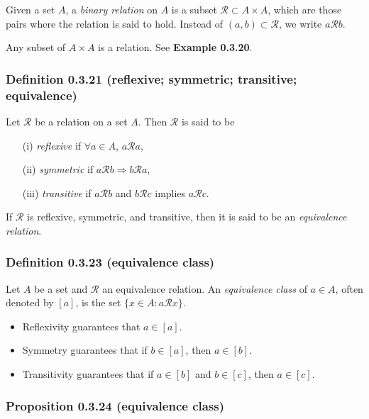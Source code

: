 \documentclass[12pt, letterpaper, oneside]{book}
\begin{document}
Given a set $A$, a \textit{binary relation} on $A$ is a subset $\mathcal{R}
  \subset A \times A$, which are those pairs where the relation is said to hold.
Instead of $(a, b) \subset \mathcal{R}$, we write $a \mathcal{R} b$.

Any subset of $A \times A$ is a relation. See \textbf{Example 0.3.20}.

\subsubsection{
  Definition 0.3.21 (reflexive; symmetric; transitive; equivalence)
}

Let $\mathcal{R}$ be a relation on a set $A$. Then $\mathcal{R}$ is said to be
\begin{enumerate}
  \item[(i)] \textit{reflexive} if $\forall a \in A$, $a \mathcal{R} a$,
  \item[(ii)] \textit{symmetric} if $a \mathcal{R} b \Rightarrow b \mathcal{R}
          a$,
  \item[(iii)] \textit{transitive} if $a \mathcal{R} b$ and $b \mathcal{R} c$
        implies $a \mathcal{R} c$.
\end{enumerate}

If $\mathcal{R}$ is reflexive, symmetric, and transitive, then it is said to be
an \textit{equivalence relation}.

\subsubsection{Definition 0.3.23 (equivalence class)}

Let $A$ be a set and $\mathcal{R}$ an equivalence relation. An
\textit{equivalence class} of $a \in A$, often denoted by $[a]$, is the set
$\{x \in A: a \mathcal{R} x\}$.

\begin{itemize}
  \item Reflexivity guarantees that $a \in [a]$.
  \item Symmetry guarantees that if $b \in [a]$, then $a \in [b]$.
  \item Transitivity guarantees that if $a \in [b]$ and $b \in [c]$, then $a
          \in [c]$.
\end{itemize}

\subsubsection{Proposition 0.3.24 (equivalence class)}
\end{document}
